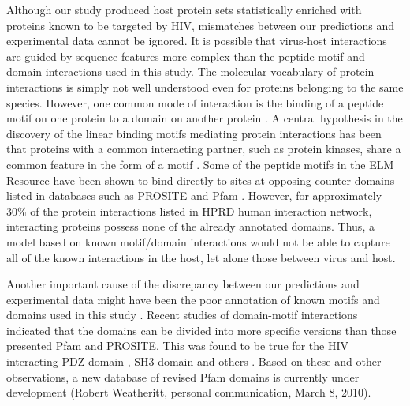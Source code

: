 Although our study produced host protein sets statistically enriched
with proteins known to be targeted by HIV, mismatches between our
predictions and experimental data cannot be ignored. It is possible
that virus-host interactions are guided by sequence features more
complex than the peptide motif and domain interactions used in this
study. The molecular vocabulary of protein interactions is simply not
well understood even for proteins belonging to the same
species. However, one common mode of interaction is the binding of a
peptide motif on one protein to a domain on another protein
\cite{morgan03}. A central hypothesis in the discovery of the linear
binding motifs mediating protein interactions has been that proteins
with a common interacting partner, such as protein kinases, share a
common feature in the form of a motif \cite{neduva05febs}. Some of the
peptide motifs in the ELM Resource have been shown to bind directly to
sites at opposing counter domains listed in databases such as PROSITE
and Pfam \cite{neduva05plos}. However, for approximately 30\% of the
protein interactions listed in HPRD human interaction network,
interacting proteins possess none of the already annotated
domains. Thus, a model based on known motif/domain interactions would
not be able to capture all of the known interactions in the host, let
alone those between virus and host.

Another important cause of the discrepancy between our predictions and
experimental data might have been the poor annotation of known motifs
and domains used in this study \cite{deilla08}. Recent studies of
domain-motif interactions indicated that the domains can be divided
into more specific versions than those presented Pfam and
PROSITE. This was found to be true for the HIV interacting PDZ domain
\cite{tonikian08}, SH3 domain \cite{shelton08} and others
\cite{kadaveru08}. Based on these and other observations, a new
database of revised Pfam domains is currently under development
(Robert Weatheritt, personal communication, March 8, 2010).

